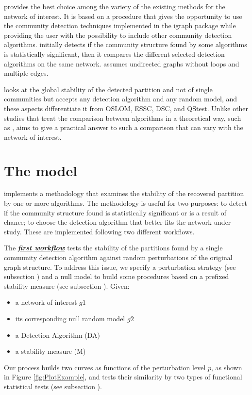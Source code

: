  provides the best choice among the variety of the existing methods for the network of interest. It is based on a procedure that gives the opportunity to use the community detection techniques implemented in the igraph package \cite{Csardi:2019} while providing the user with the possibility to include other community detection algorithms.
 initially detects if the community structure found by some algorithms is statistically significant, then it compares the different selected detection algorithms on the same network.
 assumes undirected graphs without loops and multiple edges.


 looks at the global stability of the detected partition and not of single communities but accepts any detection algorithm and any random model, and these aspects differentiate it from OSLOM, ESSC, DSC, and QStest.
Unlike other studies that treat the comparison between algorithms in a theoretical way, such as \cite{Yang_et_al:2016},  aims to give a practical answer to such a comparison that can vary with the network of interest.


\section{The model} \label{sec:model}


 implements a methodology that examines the stability of the recovered partition by one or more algorithms. The methodology is useful for two purposes: to detect if the community structure found is statistically significant or is a result of chance; to choose the detection algorithm that better fits the network under study. These are implemented following two different workflows.\hfill \break



The \textbf{\emph{\underline{first workflow}}} tests the stability of the partitions found by a single community detection algorithm against random perturbations of the original graph structure. To address this issue, we specify a perturbation strategy (see subsection \textbf{}) and a null model to build some procedures based on a prefixed stability measure (see subsection \textbf{}).
Given:
\begin{itemize}
    \item a network of interest $g1$
    \item its corresponding null random model $g2$
    \item a Detection Algorithm (DA)
    \item a stability measure (M)
\end{itemize}  
Our process builds two curves as functions of the perturbation level $p$, as shown in Figure \ref{fig:PlotExample}, and tests their similarity by two types of functional statistical tests (see subsection \textbf{}).


